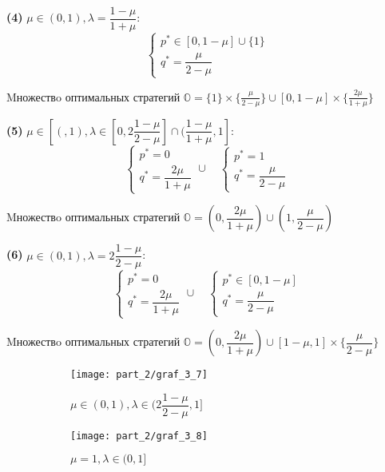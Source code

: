 \begin{flushleft}
\textbf{(4)}
$\mu \in (0,1), \lambda = \dfrac{1-\mu}{1+\mu}$:
$$
	\begin{cases}
		p^* \in [0, 1 - \mu] \cup \{1\} \\
		q^* = \dfrac{\mu}{2 - \mu}
	\end{cases}
$$

Mножествo оптимальных стратегий 
$\mathbb{O} = \{1\} \times \{\frac{\mu}{2-\mu}\} \cup
[0,1-\mu] \times \{\frac{2\mu}{1+\mu}\}$ 

\hspace{5mm}

\textbf{(5)}
$\mu \in [(, 1), \lambda \in 
[0, 2\dfrac{1 - \mu}{2 - \mu}] \cap (\dfrac{1 - \mu}{1 + \mu}, 1]$: 
$$
	\begin{cases}
		p^* = 0 \\
		q^* = \dfrac{2\mu}{1 + \mu}
	\end{cases}  \cup \quad
	\begin{cases}
		p^* = 1 \\
		q^* = \dfrac{\mu}{2 - \mu}
	\end{cases}
$$

Mножествo оптимальных стратегий 
$\mathbb{O} = (0, \dfrac{2\mu}{1 + \mu}) \cup
(1, \dfrac{\mu}{2 - \mu})$ 

\hspace{5mm}

\textbf{(6)}
$\mu \in (0, 1), \lambda = 2\dfrac{1 - \mu}{2 - \mu}$: 
$$
	\begin{cases}
		p^* = 0 \\
		q^* = \dfrac{2\mu}{1 + \mu}
	\end{cases}  \cup \quad
	\begin{cases}
		p^* \in [0, 1 - \mu] \\
		q^* = \dfrac{\mu}{2 - \mu} 
	\end{cases}
$$

Mножествo оптимальных стратегий 
$\mathbb{O} =(0, \dfrac{2\mu}{1+\mu}) \cup
[1 - \mu, 1] \times \{\dfrac{\mu}{2 - \mu}\}$ 

\begin{figure}[H]
	\centering
	\begin{subfigure}[b]{0.4 \textwidth}
		\texttt{[image: part\_2/graf\_3\_7]}
		\caption{
			$\mu \in (0, 1), 
			\lambda \in (2\dfrac{1 - \mu}{2 - \mu}, 1]$		
		}
	\end{subfigure}
	\begin{subfigure}[b]{0.4 \textwidth}
		\texttt{[image: part\_2/graf\_3\_8]}
		\caption{
			$\mu = 1, \lambda \in (0, 1] $		
		}
	\end{subfigure}
	\caption{}
\end{figure}


\end{flushleft}
